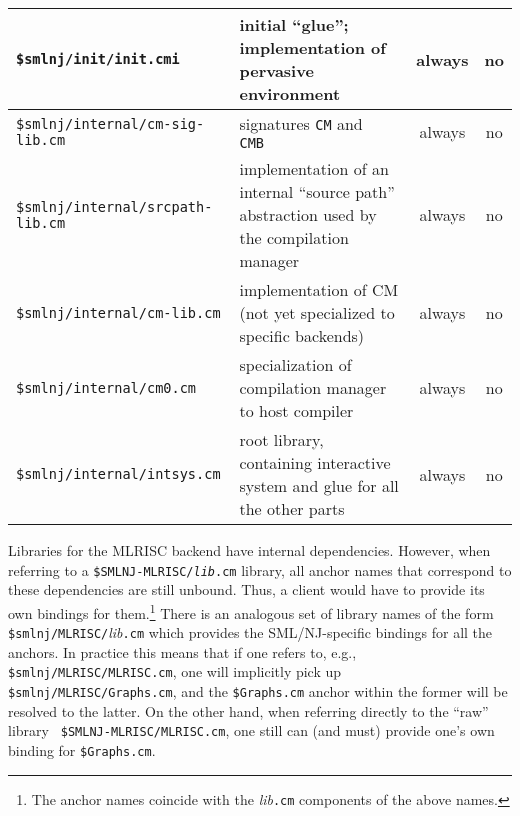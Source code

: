 \begin{small}
\begin{center}
\begin{tabular}{p{2.5in}||p{2.6in}|c|c}
\hline \hline
{\tt \$smlnj/init/init.cmi} & initial ``glue''; implementation of
pervasive environment & always & no \\
\hline \hline
{\tt \$smlnj/internal/cm-sig-lib.cm} & signatures {\tt CM} and {\tt
CMB} & always & no \\
\hline
{\tt \$smlnj/internal/srcpath-lib.cm} & implementation of an internal
``source path'' abstraction used by the compilation manager & always &
no \\
\hline
{\tt \$smlnj/internal/cm-lib.cm} & implementation of CM
(not yet specialized to specific backends) & always & no \\
\hline
{\tt \$smlnj/internal/cm0.cm} & specialization of compilation manager
to host compiler & always &
no \\
\hline
{\tt \$smlnj/internal/intsys.cm} & root library, containing
interactive system and glue for all the other parts & always &
no
\end{tabular}
\end{center}
\end{small}

Libraries for the MLRISC backend have internal dependencies.  However,
when referring to a {\tt \$SMLNJ-MLRISC/{\it lib}.cm} library, all
anchor names that correspond to these dependencies are still unbound.
Thus, a client would have to provide its own bindings for
them.\footnote{The anchor names coincide with the {\it lib}{\tt .cm}
components of the above names.} There is an analogous set of library
names of the form {\tt \$smlnj/MLRISC/}{\it lib}{\tt .cm} which
provides the SML/NJ-specific bindings for all the anchors.  In
practice this means that if one refers to, e.g., {\tt
\$smlnj/MLRISC/MLRISC.cm}, one will implicitly pick up {\tt
\$smlnj/MLRISC/Graphs.cm}, and the {\tt \$Graphs.cm} anchor within the
former will be resolved to the latter.  On the other hand, when
referring directly to the ``raw'' library {\tt
\$SMLNJ-MLRISC/MLRISC.cm}, one still can (and must) provide one's own
binding for {\tt \$Graphs.cm}.
